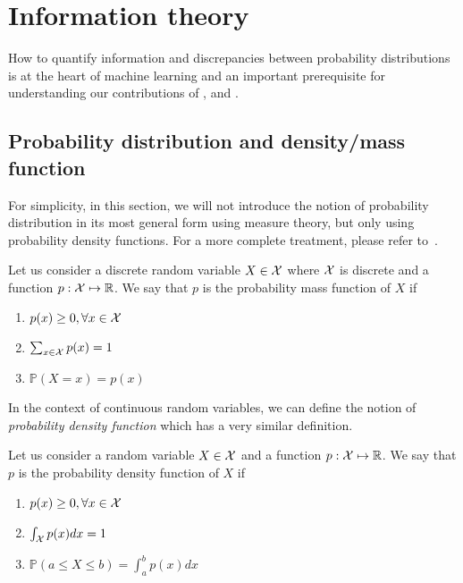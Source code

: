 \section{Information theory}
\label{sec:infoth}
How to quantify information and discrepancies between probability distributions is at the heart of machine learning and an important prerequisite for understanding our contributions of ,  and .

\subsection{Probability distribution and density/mass function}
For simplicity, in this section, we will not introduce the notion of probability distribution in its most general form using measure theory, but only using probability density functions. For a more complete treatment, please refer to~\citet{kolmogorov2018foundations, billingsley2008probability}.

\begin{definition}
Let us consider a discrete random variable $X \in {\mathcal{X}}$ where ${\mathcal{X}}$ is discrete and a function $p: {\mathcal{X}} \mapsto \mathbb{R}$. We say that $p$ is the probability mass function of $X$ if
\begin{enumerate}
    \item $p(x) \ge 0, \forall x \in {\mathcal{X}}$
    \item $\sum_{x \in {\mathcal{X}}} p(x) = 1$
    \item $\mathbb{P}(X = x) = p(x)$
\end{enumerate}
\end{definition}

In the context of continuous random variables, we can define the notion of \emph{probability density function} which has a very similar definition.
\begin{definition}
Let us consider a random variable $X \in {\mathcal{X}}$ and a function $p: {\mathcal{X}} \mapsto \mathbb{R}$. We say that $p$ is the probability density function of $X$ if
\begin{enumerate}
    \item $p(x) \ge 0, \forall x \in {\mathcal{X}}$
    \item $\int_{\mathcal{X}} p(x) dx = 1$
    \item $\mathbb{P}(a \le X \le b) = \int_a^b p(x) dx$
\end{enumerate}
\end{definition}


